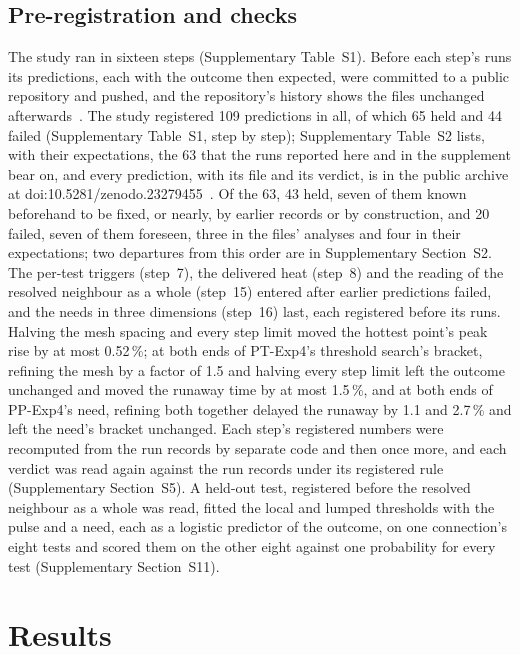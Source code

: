 \documentclass[preprint,12pt]{elsarticle}
\begin{document}
\subsection{Pre-registration and checks}
\label{sec:prereg}

The study ran in sixteen steps (Supplementary Table~S1). Before each step's runs its predictions, each with the outcome then expected, were committed to a public repository and pushed, and the repository's history shows the files unchanged afterwards~\cite{satte2026repo}. The study registered 109 predictions in all, of which 65 held and 44 failed (Supplementary Table~S1, step by step); Supplementary Table~S2 lists, with their expectations, the 63 that the runs reported here and in the supplement bear on, and every prediction, with its file and its verdict, is in the public archive at doi:10.5281/zenodo.23279455~\cite{satte2026repo}. Of the 63, 43 held, seven of them known beforehand to be fixed, or nearly, by earlier records or by construction, and 20 failed, seven of them foreseen, three in the files' analyses and four in their expectations; two departures from this order are in Supplementary Section~S2. The per-test triggers (step~7), the delivered heat (step~8) and the reading of the resolved neighbour as a whole (step~15) entered after earlier predictions failed, and the needs in three dimensions (step~16) last, each registered before its runs. Halving the mesh spacing and every step limit moved the hottest point's peak rise by at most 0.52\,\%; at both ends of PT-Exp4's threshold search's bracket, refining the mesh by a factor of 1.5 and halving every step limit left the outcome unchanged and moved the runaway time by at most 1.5\,\%, and at both ends of PP-Exp4's need, refining both together delayed the runaway by 1.1 and 2.7\,\% and left the need's bracket unchanged. Each step's registered numbers were recomputed from the run records by separate code and then once more, and each verdict was read again against the run records under its registered rule (Supplementary Section~S5). A held-out test, registered before the resolved neighbour as a whole was read, fitted the local and lumped thresholds with the pulse and a need, each as a logistic predictor of the outcome, on one connection's eight tests and scored them on the other eight against one probability for every test (Supplementary Section~S11).

\section{Results}
\label{sec:results}
\end{document}
